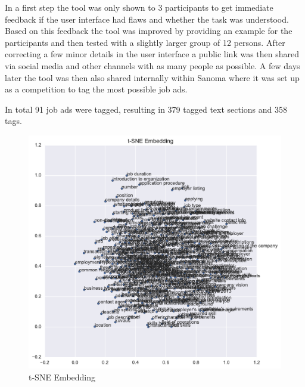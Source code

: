 In a first step the tool was only shown to 3 participants to get immediate feedback if the user interface had flaws and whether the task was understood.   Based on this feedback the tool was improved by providing an example for the participants and then tested with a slightly larger group of 12 persons. After correcting a few minor details in the user interface a public link was then shared via social media and other channels with as many people as possible. A few days later the tool was then also shared internally within Sanoma where it was set up as a competition to tag the most possible job ads.

In total 91 job ads were tagged, resulting in 379 tagged text sections and 358 tags.


\begin{figure}[h]
    \centering
    \includegraphics[width=\textwidth]{img/paragraph-data-tSNE.pdf}
    \caption{t-SNE Embedding}
\label{fig:paragraph-data-tSNE}
\end{figure}

